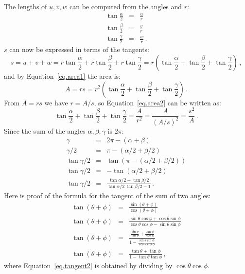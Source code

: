 \documentclass[11pt,a4paper]{article}
\begin{document}
\vspace*{-4ex}

The lengths of $u,v,w$ can be computed from the angles and $r$:
\begin{eqnarray}
\tan \frac{\alpha}{2} &=& \frac{u}{r}\label{eq.alpha}\\
\tan \frac{\beta}{2} &=& \frac{v}{r}\label{eq.beta}\\
\tan \frac{\gamma}{2} &=& \frac{w}{r}\label{eq.gamma}\,.
\end{eqnarray}
$s$ can now be expressed in terms of the tangents:
\[
s = u+v+w = r\tan \frac{\alpha}{2}+r\tan \frac{\beta}{2}+r\tan \frac{\gamma}{2} = r\left(\tan \frac{\alpha}{2}+\tan \frac{\beta}{2}+\tan \frac{\gamma}{2}\right)\,,
\]
and by Equation~\ref{eq.area1} the area is:
\begin{equation}
A = rs = r^2\left(\tan \frac{\alpha}{2}+\tan \frac{\beta}{2}+\tan \frac{\gamma}{2}\right)\,.\label{eq.area2}
\end{equation}
From $A=rs$ we have $r=A/s$, so Equation~\ref{eq.area2} can be written as:
\begin{equation}
\tan \frac{\alpha}{2}+\tan \frac{\beta}{2}+\tan \frac{\gamma}{2} = \frac{A}{r^2} = \frac{A}{(A/s)^2} = \frac{s^2}{A}\,.\label{eq.area3}
\end{equation}
Since the sum of the angles $\alpha,\beta,\gamma$ is $2\pi$:
\begin{eqnarray}
\gamma &=& 2\pi - (\alpha + \beta)\\
\gamma/2 &=& \pi - (\alpha/2 + \beta/2)\\
\tan\gamma/2 &=& \tan(\pi - (\alpha/2 + \beta/2))\\
\tan\gamma/2 &=& -\tan (\alpha/2 + \beta/2)\\
\tan\gamma/2 &=& \frac{\tan\alpha/2 + \tan\beta/2}{\tan\alpha/2 \, \tan\beta/2-1}\,.\label{eq.tangent1}
\end{eqnarray}
Here is proof of the formula for the tangent of the sum of two angles:
\begin{eqnarray}
\tan (\theta+\phi) &=& \frac{\sin(\theta+\phi)}{\cos(\theta+\phi)}\\
\tan (\theta+\phi) &=&\frac{\sin\theta\cos\phi+\cos\theta\sin\phi}{\cos\theta\cos\phi-\sin\theta\sin\phi}\\
\tan (\theta+\phi) &=&\frac{\displaystyle\frac{\sin\theta}{\cos\theta}+\frac{\sin\phi}{\cos\phi}}{\displaystyle 1-\frac{\sin\theta\sin\phi}{\cos\theta\cos\phi}}\label{eq.tangent2}\\
\tan (\theta+\phi) &=&\frac{\tan\theta + \tan \phi}{1-\tan\theta\tan\phi}\,,\label{eq.tangent3}
\end{eqnarray}
where Equation~\ref{eq.tangent2} is obtained by dividing by $\cos\theta\cos\phi$.
\end{document}
